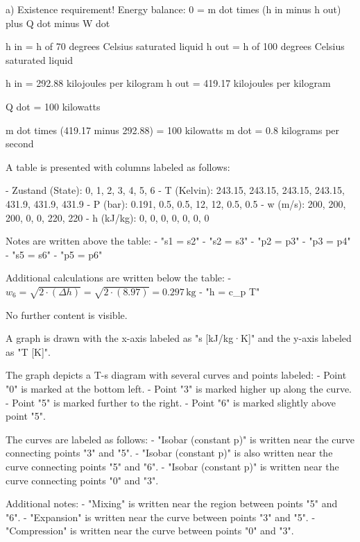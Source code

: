 a) Existence requirement!  
Energy balance:  
0 = m dot times (h in minus h out) plus Q dot minus W dot  

h in = h of 70 degrees Celsius saturated liquid  
h out = h of 100 degrees Celsius saturated liquid  

h in = 292.88 kilojoules per kilogram  
h out = 419.17 kilojoules per kilogram  

Q dot = 100 kilowatts  

m dot times (419.17 minus 292.88) = 100 kilowatts  
m dot = 0.8 kilograms per second

A table is presented with columns labeled as follows:  

- Zustand (State): 0, 1, 2, 3, 4, 5, 6  
- T (Kelvin): 243.15, 243.15, 243.15, 243.15, 431.9, 431.9, 431.9  
- P (bar): 0.191, 0.5, 0.5, 12, 12, 0.5, 0.5  
- w (m/s): 200, 200, 200, 0, 0, 220, 220  
- h (kJ/kg): 0, 0, 0, 0, 0, 0, 0  

Notes are written above the table:  
- "s1 = s2"  
- "s2 = s3"  
- "p2 = p3"  
- "p3 = p4"  
- "s5 = s6"  
- "p5 = p6"  

Additional calculations are written below the table:  
- \( w_6 = \sqrt{2 \cdot (\Delta h)} = \sqrt{2 \cdot (8.97)} = 0.297 \, \text{kg} \)  
- "h = c_p \cdot T"  

No further content is visible.

A graph is drawn with the x-axis labeled as "s [kJ/kg·K]" and the y-axis labeled as "T [K]".  

The graph depicts a T-s diagram with several curves and points labeled:  
- Point "0" is marked at the bottom left.  
- Point "3" is marked higher up along the curve.  
- Point "5" is marked further to the right.  
- Point "6" is marked slightly above point "5".  

The curves are labeled as follows:  
- "Isobar (constant p)" is written near the curve connecting points "3" and "5".  
- "Isobar (constant p)" is also written near the curve connecting points "5" and "6".  
- "Isobar (constant p)" is written near the curve connecting points "0" and "3".  

Additional notes:  
- "Mixing" is written near the region between points "5" and "6".  
- "Expansion" is written near the curve between points "3" and "5".  
- "Compression" is written near the curve between points "0" and "3".